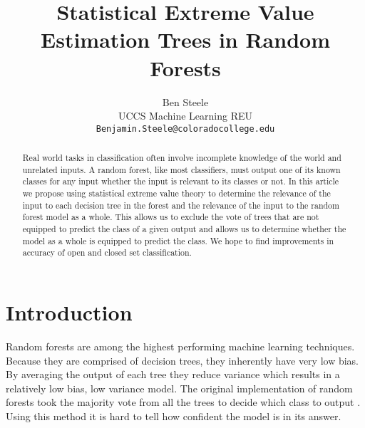 \documentclass[conference]{IEEEtran}
\author{
Ben Steele \\
UCCS Machine Learning REU \\
\texttt{Benjamin.Steele@coloradocollege.edu} \\
}
\begin{document}
\title{Statistical Extreme Value Estimation Trees in Random Forests}

\author{
}

\maketitle

\begin{abstract}
Real world tasks in classification often involve incomplete knowledge of the world 
and unrelated inputs.  A random forest, like most classifiers, must output one of its 
known classes for any input whether the input is relevant to its classes or not.  
In this article we propose using statistical extreme value theory to determine the 
relevance of the input to each decision tree in the forest and the relevance of the input 
to the random forest model as a whole.  This allows us to exclude the vote of trees that 
are not equipped to predict the class of a given output and allows us to determine whether
the model as a whole is equipped to predict the class.  We hope to find improvements in 
accuracy of open and closed set classification.

\end{abstract}

\section{Introduction}

Random forests are among the highest performing machine learning techniques.  Because they are comprised of decision trees, 
they inherently have very low bias.  By averaging the output of each tree they reduce variance which 
results in a relatively low bias, low variance model.  The original implementation of random forests took
 the majority vote from all the trees to decide which class to output \cite{RF}.  Using this method it is hard to tell 
 how confident the model is in its answer.  \par
 
\end{document}
